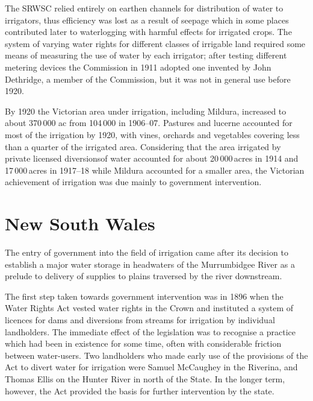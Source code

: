 The SRWSC relied entirely on earthen channels for distribution of
water to irrigators, thus efficiency was lost as a result of seepage
which in some places contributed later to waterlogging
 with harmful
effects for irrigated crops.  The system of varying water rights for
different classes of irrigable land required some means of measuring
the use of water by each irrigator; after testing different metering
devices the Commission in 1911 adopted one invented by John Dethridge,
a member of the Commission, but it was not in general use before
1920.

By 1920 the Victorian area under irrigation, including Mildura,
increased to about 370\,000 ac from 104\,000 in 1906--07.  Pastures
and luc\-er\-ne accounted for most of the irrigation by 1920, with
vines, orchards and vegetables covering less than a quarter of the
irrigated area. Considering that the area irrigated by private
licensed diversionsof water accounted for about 20\,000\,acres in 1914
and 17\,000\,acres in 1917--18 while Mildura accounted for a smaller
area, the Victorian achievement of irrigation was due mainly to
government intervention.

\section*{New South Wales}

The entry of government into the field of irrigation came after its
decision to establish a major water storage in headwaters of the
Murrumbidgee River  as a prelude to delivery
of supplies to plains traversed by the river downstream.

The first step taken towards government intervention was in 1896 when
the Water Rights Act vested water rights in the Crown and instituted a
system of licences for dams and diversions from streams for irrigation
by individual landholders.  The immediate effect of the legislation
was to recognise a practice which had been in existence for some time,
often with considerable friction between water-users.  Two landholders
who made early use of the provisions of the Act to divert water for
irrigation were Samuel McCaughey  in the
Riverina, and Thomas Ellis on the Hunter River  in
north of the State.  In the longer term, however, the Act provided the
basis for further intervention by the state.

